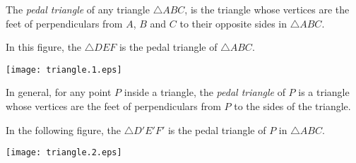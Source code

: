 \documentclass[12pt]{article}
\begin{document}
The \emph{pedal triangle} of any triangle $\triangle ABC$,
is the triangle whose vertices are the feet of perpendiculars from 
$A$, $B$ and $C$ to their opposite sides in $\triangle ABC$.

In this figure, the $\triangle DEF$ is the pedal triangle
of $\triangle ABC$.
\begin{center}
\texttt{[image: triangle.1.eps]}
\end{center}

In general, for any point $P$ inside a triangle, the \emph{pedal triangle} of $P$ is a triangle whose vertices are the 
feet of perpendiculars from $P$ to the sides of the triangle.

In the following figure, the $\triangle D'E'F'$ is the pedal
triangle of $P$ in $\triangle ABC$.

\begin{center}
\texttt{[image: triangle.2.eps]}
\end{center}

\end{document}
